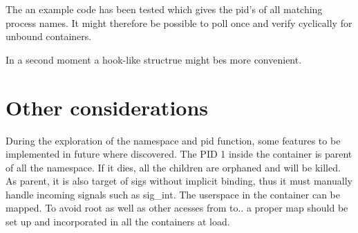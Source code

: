 \documentclass[]{scrartcl}
\begin{document}
The an example code has been tested which gives the pid's of all matching process names. 
It might therefore be possible to poll once and verify cyclically for unbound containers. 

In a second moment a hook-like structrue might bes more convenient.


\section{Other considerations}

During the exploration of the namespace and pid function, some features to be implemented in future where discovered. 
The PID 1 inside the container is parent of all the namespace. If it dies, all the children are orphaned and will be killed. As parent, it is also target of sigs without implicit binding, thus it must manually handle incoming signals such as sig\_int.
The userspace in the container can be mapped. To avoid root as well as other acesses from to.. a proper map should be set up and incorporated in all the containers at load.
\end{document}
